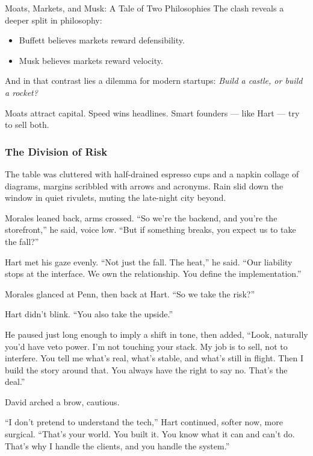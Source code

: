 \begin{HistoricalSidebar}{Moats, Markets, and Musk: A Tale of Two Philosophies}
  The clash reveals a deeper split in philosophy:  

  \medskip
  
  \begin{itemize}
    \item Buffett believes markets reward defensibility.
    \item Musk believes markets reward velocity.
  \end{itemize}
  
  \medskip
  
  And in that contrast lies a dilemma for modern startups:  
  \textit{Build a castle, or build a rocket?}  

  \medskip
  
  Moats attract capital. Speed wins headlines.  
  Smart founders — like Hart — try to sell both.
  
\end{HistoricalSidebar}

\medskip

\subsubsection{The Division of Risk}

The table was cluttered with half-drained espresso cups and a napkin collage of diagrams, margins scribbled with 
arrows and acronyms. Rain slid down the window in quiet rivulets, muting the late-night city beyond.

Morales leaned back, arms crossed. “So we’re the backend, and you’re the storefront,” he said, voice low. “But 
if something breaks, you expect us to take the fall?”

Hart met his gaze evenly. “Not just the fall. The heat,” he said. “Our liability stops at the interface. We own 
the relationship. You define the implementation.”

Morales glanced at Penn, then back at Hart. “So we take the risk?”

Hart didn’t blink. “You also take the upside.”

He paused just long enough to imply a shift in tone, then added, “Look, naturally you'd have veto power. 
I’m not touching your stack. My job is to sell, not to interfere. You tell me what’s real, what’s stable, 
and what’s still in flight. Then I build the story around that. You always have the right to say no. 
That’s the deal.”

David arched a brow, cautious.

“I don’t pretend to understand the tech,” Hart continued, softer now, more surgical. “That’s your world. You built it. 
You know what it can and can’t do. That’s why I handle the clients, and you handle the system.”

